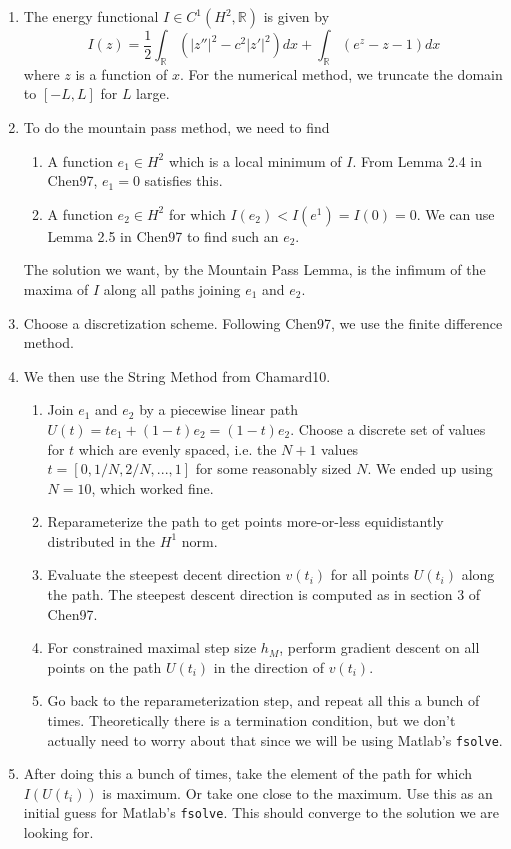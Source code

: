 \documentclass[12pt]{article}
\def\R{{\mathbb R}}
\begin{document}
\begin{enumerate}
	\item The energy functional $I \in C^1(H^2, \R)$ is given by
	\begin{equation}
	I(z) = \frac{1}{2} \int_\R (|z''|^2 - c^2 |z'|^2)dx 
	+ \int_\R (e^z - z - 1) dx
	\end{equation}
	where $z$ is a function of $x$. For the numerical method, we truncate the domain to $[-L, L]$ for $L$ large.
	\item To do the mountain pass method, we need to find
	\begin{enumerate}
		\item A function $e_1 \in H^2$ which is a local minimum of $I$. From Lemma 2.4 in Chen97, $e_1 = 0$ satisfies this.
		\item A function $e_2 \in H^2$ for which $I(e_2) < I(e^1) = I(0) = 0$. We can use Lemma 2.5 in Chen97 to find such an $e_2$. 
	\end{enumerate} 
	The solution we want, by the Mountain Pass Lemma, is the infimum of the maxima of $I$ along all paths joining $e_1$ and $e_2$.
	\item Choose a discretization scheme. Following Chen97, we use the finite difference method.
	\item We then use the String Method from Chamard10.
	\begin{enumerate}
		\item Join $e_1$ and $e_2$ by a piecewise linear path $U(t) = t e_1 + (1-t) e_2 = (1-t)e_2$. Choose a discrete set of values for $t$ which are evenly spaced, i.e. the $N+1$ values $t = [0, 1/N, 2/N, ..., 1]$ for some reasonably sized $N$. We ended up using $N = 10$, which worked fine.
		\item Reparameterize the path to get points more-or-less equidistantly distributed in the $H^1$ norm.
		\item Evaluate the steepest decent direction $v(t_i)$ for all points $U(t_i)$ along the path. The steepest descent direction is computed as in section 3 of Chen97.
		\item For constrained maximal step size $h_M$, perform gradient descent on all points on the path $U(t_i)$ in the direction of $v(t_i)$.
		\item Go back to the reparameterization step, and repeat all this a bunch of times. Theoretically there is a termination condition, but we don't actually need to worry about that since we will be using Matlab's \texttt{fsolve}.
	\end{enumerate}
	\item After doing this a bunch of times, take the element of the path for which $I(U(t_i))$ is maximum. Or take one close to the maximum. Use this as an initial guess for Matlab's \texttt{fsolve}. This should converge to the solution we are looking for.
\end{enumerate}
\end{document}
